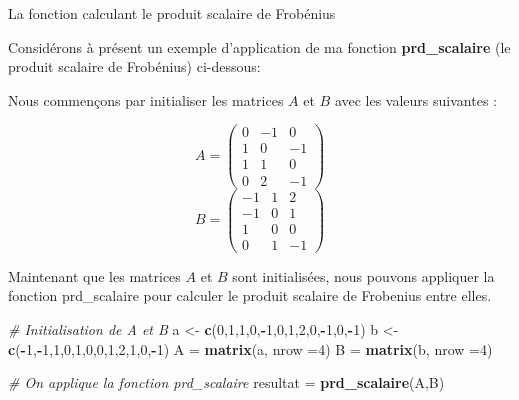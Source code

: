 \documentclass[
]{article}
\newenvironment{Shaded}{\begin{snugshade}}{\end{snugshade}}
\newcommand{\AttributeTok}[1]{\textcolor[rgb]{0.13,0.29,0.53}{#1}}
\newcommand{\CommentTok}[1]{\textcolor[rgb]{0.56,0.35,0.01}{\textit{#1}}}
\newcommand{\DecValTok}[1]{\textcolor[rgb]{0.00,0.00,0.81}{#1}}
\newcommand{\FunctionTok}[1]{\textcolor[rgb]{0.13,0.29,0.53}{\textbf{#1}}}
\newcommand{\NormalTok}[1]{#1}
\newcommand{\OtherTok}[1]{\textcolor[rgb]{0.56,0.35,0.01}{#1}}
\newcommand{\SpecialCharTok}[1]{\textcolor[rgb]{0.81,0.36,0.00}{\textbf{#1}}}
\begin{document}
La fonction calculant le produit scalaire de Frobénius

Considérons à présent un exemple d'application de ma fonction
\textbf{prd\_scalaire} (le produit scalaire de Frobénius) ci-dessous:

Nous commençons par initialiser les matrices \(A\) et \(B\) avec les
valeurs suivantes :

\[
A = \begin{pmatrix}
0 & -1 & 0 \\
1 & 0 & -1 \\
1 & 1 & 0 \\
0 & 2 & -1 
\end{pmatrix}
\] \[
B = \begin{pmatrix}
-1 & 1 & 2 \\
-1 & 0 & 1 \\
1 & 0 & 0 \\
0 & 1 & -1 
\end{pmatrix}
\]

Maintenant que les matrices \(A\) et \(B\) sont initialisées, nous
pouvons appliquer la fonction prd\_scalaire pour calculer le produit
scalaire de Frobenius entre elles.

\begin{Shaded}
\begin{Highlighting}[]
\CommentTok{\# Initialisation de A et B}
\NormalTok{a }\OtherTok{\textless{}{-}} \FunctionTok{c}\NormalTok{(}\DecValTok{0}\NormalTok{,}\DecValTok{1}\NormalTok{,}\DecValTok{1}\NormalTok{,}\DecValTok{0}\NormalTok{,}\SpecialCharTok{{-}}\DecValTok{1}\NormalTok{,}\DecValTok{0}\NormalTok{,}\DecValTok{1}\NormalTok{,}\DecValTok{2}\NormalTok{,}\DecValTok{0}\NormalTok{,}\SpecialCharTok{{-}}\DecValTok{1}\NormalTok{,}\DecValTok{0}\NormalTok{,}\SpecialCharTok{{-}}\DecValTok{1}\NormalTok{)}
\NormalTok{b }\OtherTok{\textless{}{-}} \FunctionTok{c}\NormalTok{(}\SpecialCharTok{{-}}\DecValTok{1}\NormalTok{,}\SpecialCharTok{{-}}\DecValTok{1}\NormalTok{,}\DecValTok{1}\NormalTok{,}\DecValTok{0}\NormalTok{,}\DecValTok{1}\NormalTok{,}\DecValTok{0}\NormalTok{,}\DecValTok{0}\NormalTok{,}\DecValTok{1}\NormalTok{,}\DecValTok{2}\NormalTok{,}\DecValTok{1}\NormalTok{,}\DecValTok{0}\NormalTok{,}\SpecialCharTok{{-}}\DecValTok{1}\NormalTok{)}
\NormalTok{A  }\OtherTok{=} \FunctionTok{matrix}\NormalTok{(a, }\AttributeTok{nrow =}\DecValTok{4}\NormalTok{)}
\NormalTok{B }\OtherTok{=} \FunctionTok{matrix}\NormalTok{(b, }\AttributeTok{nrow =}\DecValTok{4}\NormalTok{)}

\CommentTok{\# On applique la fonction prd\_scalaire}
\NormalTok{resultat }\OtherTok{=} \FunctionTok{prd\_scalaire}\NormalTok{(A,B)}
\end{Highlighting}
\end{Shaded}
\end{document}
